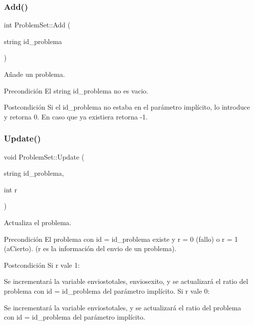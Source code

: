 \subsubsection{\texorpdfstring{Add()}{Add()}}
{\footnotesize\ttfamily int Problem\+Set\+::\+Add (\begin{DoxyParamCaption}\item[{string}]{id\+\_\+problema }\end{DoxyParamCaption})}



Añade un problema. 

\begin{DoxyPrecond}{Precondición}
El string id\+\_\+problema no es vacio. 
\end{DoxyPrecond}
\begin{DoxyPostcond}{Postcondición}
Si el id\+\_\+problema no estaba en el parámetro implícito, lo introduce y retorna 0. En caso que ya existiera retorna -\/1. 
\end{DoxyPostcond}
\mbox{\label{class_problem_set_a80e552f84e64c3f03a92675927b8cae4}} 
\subsubsection{\texorpdfstring{Update()}{Update()}}
{\footnotesize\ttfamily void Problem\+Set\+::\+Update (\begin{DoxyParamCaption}\item[{string}]{id\+\_\+problema,  }\item[{int}]{r }\end{DoxyParamCaption})}



Actualiza el problema. 

\begin{DoxyPrecond}{Precondición}
El problema con id = id\+\_\+problema existe y r = 0 (fallo) o r = 1 (a\+Cierto). (r es la información del envio de un problema). 
\end{DoxyPrecond}
\begin{DoxyPostcond}{Postcondición}
Si r vale 1\+:
\begin{DoxyItemize}
\item Se incrementará la variable enviostotales, enviosexito, y se actualizará el ratio del problema con id = id\+\_\+problema del parámetro implícito. Si r vale 0\+:
\item Se incrementará la variable enviostotales, y se actualizará el ratio del problema con id = id\+\_\+problema del parámetro implícito. 
\end{DoxyItemize}
\end{DoxyPostcond}
\mbox{\label{class_problem_set_aa0cbffad78647021f0c5c1deb3db2654}} 
